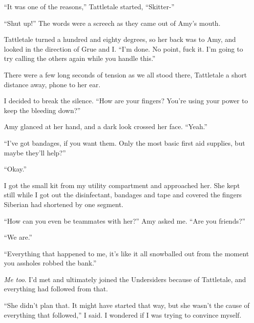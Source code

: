 ``It was one of the reasons,'' Tattletale started, ``Skitter-''



``Shut up!''  The words were a screech as they came out of Amy's mouth.



Tattletale turned a hundred and eighty degrees, so her back was to Amy, and looked in the direction of Grue and I.  ``I'm done.  No point, fuck it.  I'm going to try calling the others again while you handle this.''



There were a few long seconds of tension as we all stood there, Tattletale a short distance away, phone to her ear.



I decided to break the silence.  ``How are your fingers?  You're using your power to keep the bleeding down?''



Amy glanced at her hand, and a dark look crossed her face.  ``Yeah.''



``I've got bandages, if you want them.  Only the most basic first aid supplies, but maybe they'll help?''



``Okay.''



I got the small kit from my utility compartment and approached her.  She kept still while I got out the disinfectant, bandages and tape and covered the fingers Siberian had shortened by one segment.



``How can you even be teammates with her?''  Amy asked me.  ``Are you friends?''



``We are.''



``Everything that happened to me, it's like it all snowballed out from the moment you assholes robbed the bank.''



\emph{Me too}.  I'd met and ultimately joined the Undersiders because of Tattletale, and everything had followed from that.



``She didn't plan that.  It might have started that way, but she wasn't the cause of everything that followed,'' I said.  I wondered if I was trying to convince myself.




